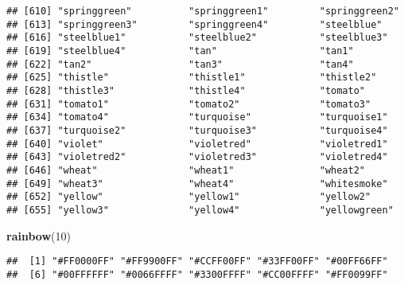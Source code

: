 \documentclass[]{article}
\newenvironment{Shaded}{\begin{snugshade}}{\end{snugshade}}
\newcommand{\KeywordTok}[1]{\textcolor[rgb]{0.13,0.29,0.53}{\textbf{#1}}}
\newcommand{\DataTypeTok}[1]{\textcolor[rgb]{0.13,0.29,0.53}{#1}}
\newcommand{\DecValTok}[1]{\textcolor[rgb]{0.00,0.00,0.81}{#1}}
\newcommand{\CharTok}[1]{\textcolor[rgb]{0.31,0.60,0.02}{#1}}
\newcommand{\StringTok}[1]{\textcolor[rgb]{0.31,0.60,0.02}{#1}}
\newcommand{\CommentTok}[1]{\textcolor[rgb]{0.56,0.35,0.01}{\textit{#1}}}
\newcommand{\OtherTok}[1]{\textcolor[rgb]{0.56,0.35,0.01}{#1}}
\newcommand{\OperatorTok}[1]{\textcolor[rgb]{0.81,0.36,0.00}{\textbf{#1}}}
\newcommand{\NormalTok}[1]{#1}
\begin{document}
\begin{verbatim}
## [610] "springgreen"          "springgreen1"         "springgreen2"        
## [613] "springgreen3"         "springgreen4"         "steelblue"           
## [616] "steelblue1"           "steelblue2"           "steelblue3"          
## [619] "steelblue4"           "tan"                  "tan1"                
## [622] "tan2"                 "tan3"                 "tan4"                
## [625] "thistle"              "thistle1"             "thistle2"            
## [628] "thistle3"             "thistle4"             "tomato"              
## [631] "tomato1"              "tomato2"              "tomato3"             
## [634] "tomato4"              "turquoise"            "turquoise1"          
## [637] "turquoise2"           "turquoise3"           "turquoise4"          
## [640] "violet"               "violetred"            "violetred1"          
## [643] "violetred2"           "violetred3"           "violetred4"          
## [646] "wheat"                "wheat1"               "wheat2"              
## [649] "wheat3"               "wheat4"               "whitesmoke"          
## [652] "yellow"               "yellow1"              "yellow2"             
## [655] "yellow3"              "yellow4"              "yellowgreen"
\end{verbatim}

\begin{Shaded}
\begin{Highlighting}[]
\KeywordTok{rainbow}\NormalTok{(}\DecValTok{10}\NormalTok{)}
\end{Highlighting}
\end{Shaded}

\begin{verbatim}
##  [1] "#FF0000FF" "#FF9900FF" "#CCFF00FF" "#33FF00FF" "#00FF66FF"
##  [6] "#00FFFFFF" "#0066FFFF" "#3300FFFF" "#CC00FFFF" "#FF0099FF"
\end{verbatim}

\begin{Shaded}
\end{Shaded}
\end{document}

